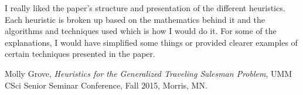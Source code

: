 \documentclass[12pt,letterpaper]{article}
\begin{document}
I really liked the paper's structure and presentation of the different heuristics. Each heuristic is broken up based on the mathematics behind it and the algorithms and techniques used which is how I would do it. For some of the explanations, I would have simplified some things or provided clearer examples of certain techniques presented in the paper.
\newline

\begin{thebibliography}{9}

	Molly Grove,
	\emph{Heuristics for the Generalized Traveling Salesman Problem},
	UMM CSci Senior Seminar Conference, Fall 2015, Morris, MN.

\end{thebibliography}
\end{document}
